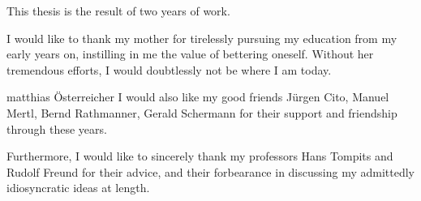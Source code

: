 \documentclass[draft,final]{vutinfth}
\begin{document}
	
	\frontmatter %
	
	\addstatementpage
	
	\begin{acknowledgements*}
		This thesis is the result of two years of work.
		
		
		I would like to thank my mother for tirelessly pursuing my education from my early years on, instilling in me the value of bettering oneself. Without her tremendous efforts, I would doubtlessly not be where I am today.
		
		matthias \"{O}sterreicher
		I would also like my good friends J\"{u}rgen Cito, Manuel Mertl, Bernd Rathmanner, Gerald Schermann for their support and friendship through these years.
		
		Furthermore, I would like to sincerely thank my professors Hans Tompits and Rudolf Freund for their advice, and their forbearance in discussing my admittedly idiosyncratic ideas at length.
	\end{acknowledgements*}
	
\end{document}
